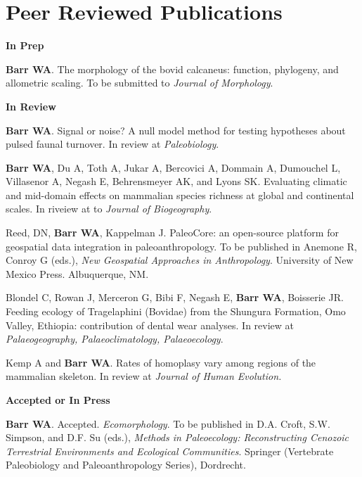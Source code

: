 \documentclass{article}
\begin{document}
\section*{Peer Reviewed Publications}
\begin{description*}
\item[] {\bfseries In Prep}

\item[] {\bfseries Barr WA}.  The morphology of the bovid calcaneus: function, phylogeny, and allometric scaling. To be submitted to \emph{Journal of Morphology}.
\end{description*}

\begin{description*}
\item[] {\bfseries In Review}
\item[] {\bfseries Barr WA}. Signal or noise? A null model method for testing hypotheses about pulsed faunal turnover. In review at \emph{Paleobiology}.
\item[]{\bfseries Barr WA}, Du A, Toth A, Jukar A,  Bercovici A,  Dommain A,  Dumouchel L,  Villasenor A,  Negash E, Behrensmeyer AK, and Lyons SK. Evaluating climatic and mid-domain effects on mammalian species richness at global and continental scales. In riveiew at to \emph{Journal of Biogeography}.
\item[] Reed, DN, {\bfseries Barr WA}, Kappelman J. PaleoCore: an open-source platform for geospatial data integration in paleoanthropology. To be published in Anemone R, Conroy G (eds.), \emph{New Geospatial Approaches in Anthropology}. University of New Mexico Press. Albuquerque, NM.
\item[] Blondel C, Rowan J, Merceron G, Bibi F,  Negash E, {\bfseries Barr WA}, Boisserie JR. Feeding ecology of Tragelaphini (Bovidae) from the Shungura Formation, Omo Valley, Ethiopia: contribution of dental wear analyses. In review at \emph{Palaeogeography, Palaeoclimatology, Palaeoecology}.

\item[] Kemp A and {\bfseries Barr WA}. Rates of homoplasy vary among regions of the mammalian skeleton. In review at \emph{Journal of Human Evolution.} 
\end{description*}

\begin{description*}
\item[] {\bfseries Accepted or In Press}
\item[] {\bfseries Barr WA}. Accepted.  \emph{Ecomorphology}. To be published in D.A. Croft, S.W. Simpson, and D.F. Su (eds.),  \emph{Methods in Paleoecology: Reconstructing Cenozoic Terrestrial Environments and Ecological Communities}. Springer (Vertebrate Paleobiology and Paleoanthropology Series), Dordrecht.
\end{description*}
\end{document}
